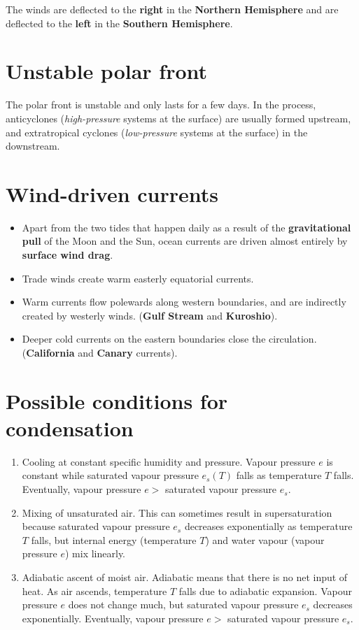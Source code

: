 \documentclass[11pt]{article}
\begin{document}
The winds are deflected to the \textbf{right} in the \textbf{Northern Hemisphere} and are deflected to the \textbf{left} in the \textbf{Southern Hemisphere}.
\section{Unstable polar front}
\label{sec:org76f6d78}
The polar front is unstable and only lasts for a few days. In the process, anticyclones (\emph{high-pressure} systems at the surface) are usually formed upstream, and extratropical cyclones (\emph{low-pressure} systems at the surface) in the downstream.
\section{Wind-driven currents}
\label{sec:orgc469f29}
\begin{itemize}
\item Apart from the two tides that happen daily as a result of the \textbf{gravitational pull} of the Moon and the Sun, ocean currents are driven almost entirely by \textbf{surface wind drag}.
\item Trade winds create warm easterly equatorial currents.
\item Warm currents flow polewards along western boundaries, and are indirectly created by westerly winds. (\textbf{Gulf Stream} and \textbf{Kuroshio}).
\item Deeper cold currents on the eastern boundaries close the circulation. (\textbf{California} and \textbf{Canary} currents).
\end{itemize}
\section{Possible conditions for condensation}
\label{sec:org38fa453}
\begin{enumerate}
\item Cooling at constant specific humidity and pressure. Vapour pressure \(e\) is constant while saturated vapour pressure \(e_s(T)\) falls as temperature \(T\) falls. Eventually, vapour pressure \(e >\) saturated vapour pressure \(e_s\).
\item Mixing of unsaturated air. This can sometimes result in supersaturation because saturated vapour pressure \(e_s\) decreases exponentially as temperature \(T\) falls, but internal energy (temperature \(T\)) and water vapour (vapour pressure \(e\)) mix linearly.
\item Adiabatic ascent of moist air. Adiabatic means that there is no net input of heat. As air ascends, temperature \(T\) falls due to adiabatic expansion. Vapour pressure \(e\) does not change much, but saturated vapour pressure \(e_s\) decreases exponentially. Eventually, vapour pressure \(e >\) saturated vapour pressure \(e_s\).
\end{enumerate}
\end{document}
